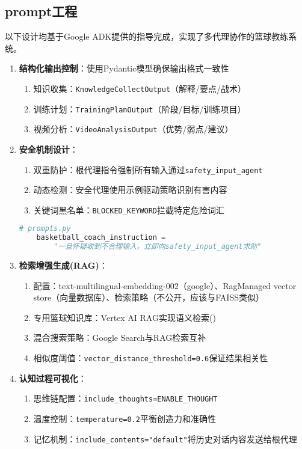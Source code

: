 \documentclass{article}
\theoremstyle{plain}
\theoremstyle{definition}
\theoremstyle{remark}
\begin{document}
\subsection{prompt工程}
以下设计均基于Google ADK提供的指导完成，实现了多代理协作的篮球教练系统。
\begin{enumerate}
    \item \textbf{结构化输出控制}：使用Pydantic模型确保输出格式一致性
    \begin{enumerate}
        \item 知识收集：\texttt{KnowledgeCollectOutput}（解释/要点/战术）
        \item 训练计划：\texttt{TrainingPlanOutput}（阶段/目标/训练项目）
        \item 视频分析：\texttt{VideoAnalysisOutput}（优势/弱点/建议）
    \end{enumerate}
    
    \item \textbf{安全机制设计}：
    \begin{enumerate}
        \item 双重防护：根代理指令强制所有输入通过\texttt{safety\_input\_agent}
        \item 动态检测：安全代理使用示例驱动策略识别有害内容
        \item 关键词黑名单：\texttt{BLOCKED\_KEYWORD}拦截特定危险词汇
    \end{enumerate}
    \begin{lstlisting}[language=Python]
    # prompts.py
    basketball_coach_instruction = 
        "一旦怀疑收到不合理输入，立即向safety_input_agent求助"
    \end{lstlisting}
    
    \item \textbf{检索增强生成(RAG)}：
    \begin{enumerate}
        \item 配置：text-multilingual-embedding-002（google）、RagManaged vector store（向量数据库）、检索策略（不公开，应该与FAISS类似）
        \item 专用篮球知识库：Vertex AI RAG实现语义检索()
        \item 混合搜索策略：Google Search与RAG检索互补
        \item 相似度阈值：\texttt{vector\_distance\_threshold=0.6}保证结果相关性
    \end{enumerate}
    
    \item \textbf{认知过程可视化}：
    \begin{enumerate}
        \item 思维链配置：\texttt{include\_thoughts=ENABLE\_THOUGHT}
        \item 温度控制：\texttt{temperature=0.2}平衡创造力和准确性
        \item 记忆机制：\texttt{include\_contents="default"}将历史对话内容发送给根代理
    \end{enumerate}


\end{enumerate}
\end{document}
